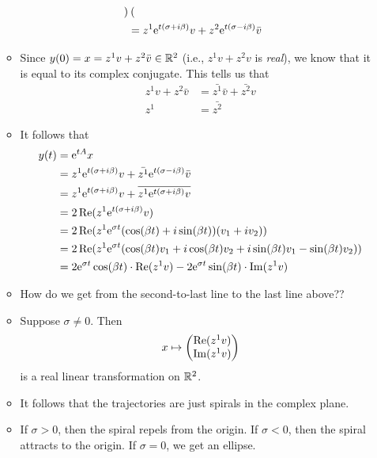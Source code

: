 \documentclass[../notes.tex]{subfiles}
\begin{document}
\begin{itemize}
\begin{itemize}
\begin{align*}
\begin{pmatrix}
            \end{pmatrix}\\
            &= z^1\e[t(\sigma+i\beta)]v+z^2\e[t(\sigma-i\beta)]\bar{v}
        \end{align*}
        \item Since $y(0)=x=z^1v+z^2\bar{v}\in\R^2$ (i.e., $z^1v+z^2v$ is \emph{real}), we know that it is equal to its complex conjugate. This tells us that
        \begin{align*}
            z^1v+z^2\bar{v} &= \bar{z^1}\bar{v}+\bar{z^2}v\\
            z^1 &= \bar{z^2}
        \end{align*}
        \item It follows that
        \begin{align*}
            y(t) &= \e[tA]x\\
            &= z^1\e[t(\sigma+i\beta)]v+\bar{z^1}\e[t(\sigma-i\beta)]\bar{v}\\
            &= z^1\e[t(\sigma+i\beta)]v+\overline{z^1\e[t(\sigma+i\beta)]v}\\
            &= 2\Ree(z^1\e[t(\sigma+i\beta)]v)\\
            &= 2\Ree(z^1\e[\sigma t](\cos(\beta t)+i\sin(\beta t))(v_1+iv_2))\\
            &= 2\Ree(z^1\e[\sigma t](\cos(\beta t)v_1+i\cos(\beta t)v_2+i\sin(\beta t)v_1-\sin(\beta t)v_2))\\
            &= 2\e[\sigma t]\cos(\beta t)\cdot\Ree(z^1v)-2\e[\sigma t]\sin(\beta t)\cdot\Imm(z^1v)
        \end{align*}
        \item How do we get from the second-to-last line to the last line above??
        \item Suppose $\sigma\neq 0$. Then
        \begin{equation*}
            x \mapsto
            \begin{pmatrix}
                \Ree(z^1v)\\
                \Imm(z^1v)\\
            \end{pmatrix}
        \end{equation*}
        is a real linear transformation on $\R^2$.
        \item It follows that the trajectories are just spirals in the complex plane.
        \item If $\sigma>0$, then the spiral repels from the origin. If $\sigma<0$, then the spiral attracts to the origin. If $\sigma=0$, we get an ellipse.

\end{itemize}
\end{itemize}
\end{document}
